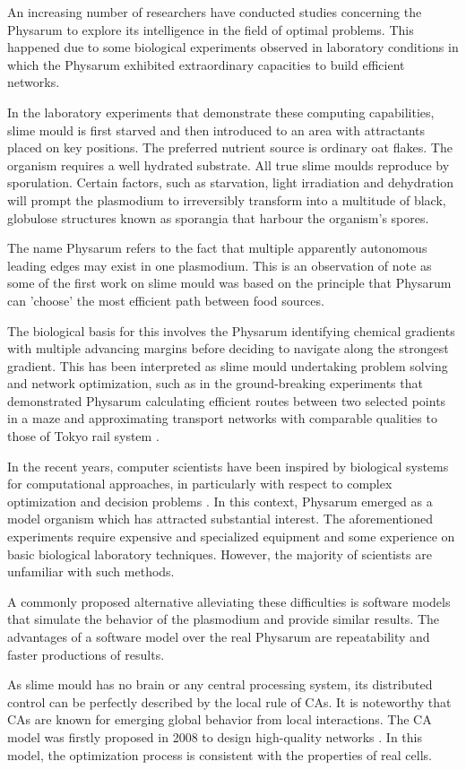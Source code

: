 An increasing number of researchers have conducted studies concerning the Physarum to explore its intelligence in the field of optimal problems. This happened due to some biological experiments observed in laboratory conditions in which the Physarum exhibited extraordinary capacities to build efficient networks.
\par
In the laboratory experiments that demonstrate these computing capabilities, slime mould is first starved and then introduced to an area with attractants placed on key positions. The preferred nutrient source is ordinary oat flakes. The organism requires a well hydrated substrate. All true slime moulds reproduce by sporulation. Certain factors, such as starvation, light irradiation and dehydration will prompt the plasmodium to irreversibly transform into a multitude of black, globulose structures known as sporangia that harbour the organism’s spores.
\par
The name Physarum refers to the fact that multiple apparently autonomous leading edges may exist in one plasmodium. This is an observation of note as some of the first work on slime mould was based on the principle that Physarum can 'choose' the most efficient path between food sources.
\par
The biological basis for this involves the Physarum identifying chemical gradients with multiple advancing margins before deciding to navigate along the strongest gradient. This has been interpreted as slime mould undertaking problem solving and network optimization, such as in the ground-breaking experiments that demonstrated Physarum calculating efficient routes between   two selected points in a maze \cite{nakagaki2000intelligence} and approximating transport networks with comparable qualities to those of Tokyo rail system \cite{Tero439}.
\par
In the recent years, computer scientists have been inspired by biological systems for computational approaches, in particularly with respect to complex optimization and decision problems \cite{grube2016physarum}. In this context, Physarum emerged as a model organism which has attracted substantial interest. The aforementioned experiments require expensive and specialized equipment and some experience on basic biological laboratory techniques. However, the majority of scientists are unfamiliar with such methods. 
\par
A commonly proposed alternative alleviating these difficulties is software models that simulate the behavior of the plasmodium and provide similar results. The advantages of a software model over the real Physarum are repeatability and faster productions of results.
\par
As slime mould has no brain or any central processing system, its distributed control can be perfectly described by the local rule of CAs. It is noteworthy that CAs are known for emerging global behavior from local interactions. The CA model was firstly proposed in 2008 to design high-quality networks \cite{gunji2008minimal}. In this model, the optimization process is consistent with the properties of real cells. 